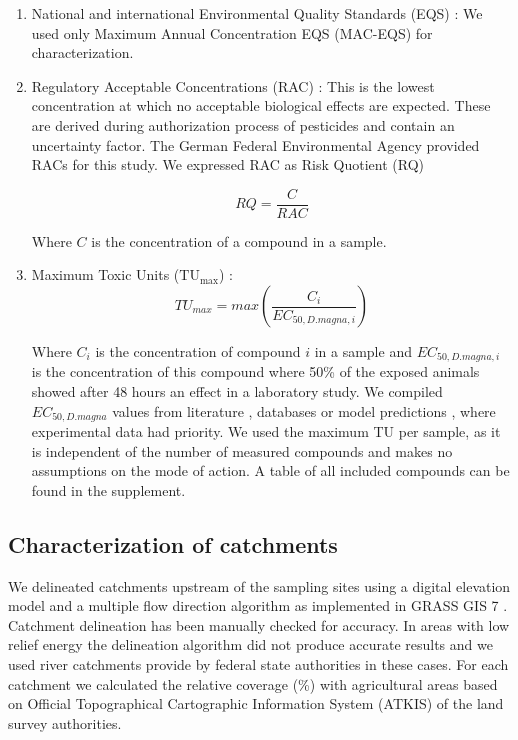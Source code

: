\documentclass[journal=esthag,manuscript=article]{achemso}
\begin{document}
\begin{enumerate}
\item National and international Environmental Quality Standards (EQS) \citep{ogewv_verordnung_2011,european_union_directive_2013}:
We used only Maximum Annual Concentration EQS (MAC-EQS) for characterization.

\item Regulatory Acceptable Concentrations (RAC) \citep{brock_linking_2010}:
This is the lowest concentration at which no acceptable biological effects are expected. 
These are derived during authorization  process of pesticides and contain an uncertainty factor.
The German Federal Environmental Agency provided RACs for this study.  
We expressed  RAC as Risk Quotient (RQ)

\begin{equation}
RQ = \frac{C}{RAC}
\end{equation}

Where $C$ is the concentration of a compound in a sample.

\item Maximum Toxic Units ($\mathrm{TU_{max}}$)  \citep{sprague_measurement_1970}: 
\begin{equation}
TU_{max} = max(\frac{C_i}{EC_{50, D.magna, i}})
\end{equation}

Where $C_i$ is the concentration of compound $i$ in a sample and $EC_{50, D.magna, i}$ is the concentration of this compound where 50\% of the exposed animals showed after 48 hours an effect in a laboratory study.
We compiled $EC_{50, D.magna}$ values from literature \citep{malaj_organic_2014}, databases \citep{pesticide_action_network_pan_2015,u.s._epa_ecotoxicology_2015} or model predictions \citep{schuurmann_quantitative_2011}, where experimental data had priority.
We used the maximum TU per sample, as it is independent of the number of measured compounds and makes no assumptions on the mode of action.
A table of all included compounds can be found in the supplement.
\end{enumerate}


\subsection{Characterization of catchments}
We delineated catchments upstream of the sampling sites using a digital elevation model \citep{eea_digital_2013} and a multiple flow direction algorithm \citep{holmgren_multiple_1994} as implemented in GRASS GIS 7 \citep{neteler_grass_2012}.
Catchment delineation has been manually checked for accuracy. 
In areas with low relief energy the delineation algorithm did not produce accurate results and we used river catchments provide by federal state authorities in these cases.
For each catchment we calculated the relative coverage (\%) with agricultural areas based on Official Topographical Cartographic Information System (ATKIS) of the land survey authorities.
\end{document}
